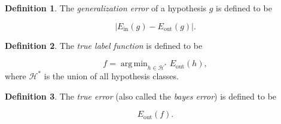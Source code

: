 \documentclass[10pt]{exam}
\theoremstyle{definition}
\newtheorem{defn}{Definition}
\DeclareMathOperator*{\argmin}{arg\,min}
\newcommand{\Ein}{E_{\text{in}}}
\newcommand{\Eout}{E_{\text{out}}}
\begin{document}
\begin{defn}
    The \emph{generalization error} of a hypothesis $g$ is defined to be
    \begin{solutionorbox}[1.7in]
    $$
        |\Ein(g) - \Eout(g)|.
    $$
    \end{solutionorbox}
\end{defn}

\begin{defn}
    The \emph{true label function} is defined to be
    \begin{solutionorbox}[1.7in]
    \begin{equation*}
        f = \argmin_{h \in \mathcal H^*} \Eout(h),
    \end{equation*}
    where $\mathcal H^*$ is the union of all hypothesis classes.
    \end{solutionorbox}
\end{defn}

\begin{defn}
    The \emph{true error} (also called the \emph{bayes error}) is defined to be
    \begin{solutionorbox}[1.7in]
    \begin{equation*}
        \Eout(f).
    \end{equation*}
    \end{solutionorbox}
\end{defn}
\end{document}
